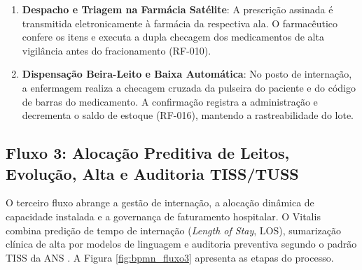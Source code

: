 \begin{enumerate}[leftmargin=*]
    \item \textbf{Despacho e Triagem na Farmácia Satélite}: A prescrição assinada é transmitida eletronicamente à farmácia da respectiva ala. O farmacêutico confere os itens e executa a dupla checagem dos medicamentos de alta vigilância antes do fracionamento (RF-010).
    \item \textbf{Dispensação Beira-Leito e Baixa Automática}: No posto de internação, a enfermagem realiza a checagem cruzada da pulseira do paciente e do código de barras do medicamento. A confirmação registra a administração e decrementa o saldo de estoque (RF-016), mantendo a rastreabilidade do lote.
\end{enumerate}

\subsection{Fluxo 3: Alocação Preditiva de Leitos, Evolução, Alta e Auditoria TISS/TUSS}
\label{subsec:bpmn_fluxo3}

O terceiro fluxo abrange a gestão de internação, a alocação dinâmica de capacidade instalada e a governança de faturamento hospitalar. O Vitalis combina predição de tempo de internação (\textit{Length of Stay}, LOS), sumarização clínica de alta por modelos de linguagem e auditoria preventiva segundo o padrão TISS da ANS \cite{ans_tiss:2023}. A Figura \ref{fig:bpmn_fluxo3} apresenta as etapas do processo.

